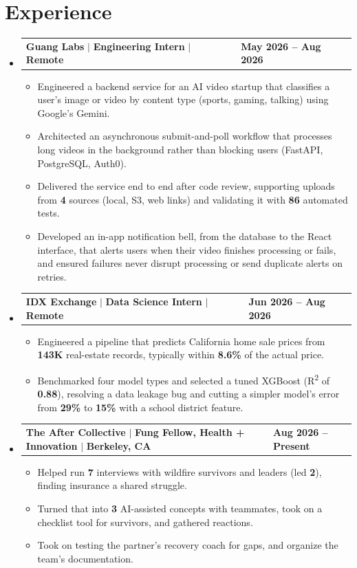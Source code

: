 \documentclass[letterpaper,11pt]{article}
\makeatletter
\newcommand{\resumeItem}[1]{
  \item\small{
    {#1 \vspace{-2pt}}
  }
}
\newcommand{\resumeCompactHeading}[4]{
  \vspace{-1pt}\item
    \begin{tabularx}{1.0\textwidth}[t]{@{}X@{}>{\raggedright\arraybackslash}p{1.5in}@{}}
      \textbf{#1} $|$ \textbf{#2} $|$ \textbf{\small #3} & \textbf{\small #4} \\
    \end{tabularx}\vspace{-3pt}
}
\newcommand{\resumeSubHeadingListStart}{\begin{itemize}[leftmargin=0.0in, label={}]}
\newcommand{\resumeSubHeadingListEnd}{\end{itemize}}
\newcommand{\resumeItemListStart}{\begin{itemize}[itemsep=2.5pt, topsep=3pt]}
\newcommand{\resumeItemListEnd}{\end{itemize}\vspace{-4pt}}
\makeatother
\begin{document}
\section{Experience}
  \resumeSubHeadingListStart

    \resumeCompactHeading
        {Guang Labs}{Engineering Intern}{Remote}{May 2026 -- Aug 2026}
        \resumeItemListStart
             \resumeItem{Engineered a backend service for an AI video startup that classifies a user's image or video by content type (sports, gaming, talking) using Google's Gemini.}
             \resumeItem{Architected an asynchronous submit-and-poll workflow that processes long videos in the background rather than blocking users (FastAPI, PostgreSQL, Auth0).}
             \resumeItem{Delivered the service end to end after code review, supporting uploads from \textbf{4} sources (local, S3, web links) and validating it with \textbf{86} automated tests.}
             \resumeItem{Developed an in-app notification bell, from the database to the React interface, that alerts users when their video finishes processing or fails, and ensured failures never disrupt processing or send duplicate alerts on retries.}
        \resumeItemListEnd

    \resumeCompactHeading
        {IDX Exchange}{Data Science Intern}{Remote}{Jun 2026 -- Aug 2026}
        \resumeItemListStart
            \resumeItem{Engineered a pipeline that predicts California home sale prices from \textbf{143K} real-estate records, typically within \textbf{8.6\%} of the actual price.}
            \resumeItem{Benchmarked four model types and selected a tuned XGBoost (R\textsuperscript{2} of \textbf{0.88}), resolving a data leakage bug and cutting a simpler model's error from \textbf{29\%} to \textbf{15\%} with a school district feature.}
        \resumeItemListEnd

    \resumeCompactHeading
        {The After Collective}{Fung Fellow, Health + Innovation}{Berkeley, CA}{Aug 2026 -- Present}
        \resumeItemListStart
            \resumeItem{Helped run \textbf{7} interviews with wildfire survivors and leaders (led \textbf{2}), finding insurance a shared struggle.}
            \resumeItem{Turned that into \textbf{3} AI-assisted concepts with teammates, took on a checklist tool for survivors, and gathered reactions.}
            \resumeItem{Took on testing the partner's recovery coach for gaps, and organize the team's documentation.}
        \resumeItemListEnd

  \resumeSubHeadingListEnd
\vspace{-12pt}
\end{document}
